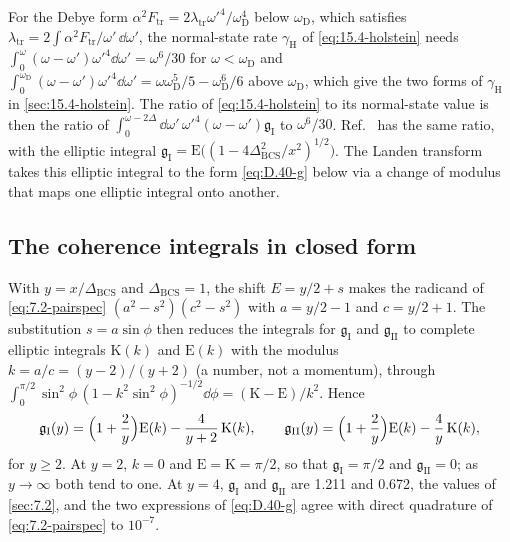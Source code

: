 For the Debye form $\alpha^2F_{\mathrm{tr}} = 2\lambda_{\mathrm{tr}}\omega'^4/\omega_{\mathrm{D}}^4$ below $\omega_{\mathrm{D}}$, which satisfies $\lambda_{\mathrm{tr}} = 2\int\alpha^2F_{\mathrm{tr}}/\omega'\,\dd\omega'$, the normal-state rate $\gamma_{\mathrm{H}}$ of \cref{eq:15.4-holstein} needs $\int_0^{\omega}(\omega - \omega')\omega'^4\dd\omega' = \omega^6/30$ for $\omega < \omega_{\mathrm{D}}$ and $\int_0^{\omega_{\mathrm{D}}}(\omega - \omega')\omega'^4\dd\omega' = \omega\omega_{\mathrm{D}}^5/5 - \omega_{\mathrm{D}}^6/6$ above $\omega_{\mathrm{D}}$, which give the two forms of $\gamma_{\mathrm{H}}$ in \cref{sec:15.4-holstein}. The ratio of \cref{eq:15.4-holstein} to its normal-state value is then the ratio of $\int_0^{\omega - 2\Delta}\dd\omega'\,\omega'^4(\omega - \omega')\mathfrak{g}_{\mathrm{I}}$ to $\omega^6/30$. Ref.~\cite[Eq.~(17)]{hochberg2016absorption} has the same ratio, with the elliptic integral $\mathfrak{g}_{\mathrm{I}} = \mathrm{E}\bigl((1 - 4\Delta_{\mathrm{BCS}}^2/x^2)^{1/2}\bigr)$. The Landen transform takes this elliptic integral to the form \cref{eq:D.40-g} below via a change of modulus that maps one elliptic integral onto another.

\subsection*{The coherence integrals in closed form}

With $y = x/\Delta_{\mathrm{BCS}}$ and $\Delta_{\mathrm{BCS}} = 1$, the shift $E = y/2 + s$ makes the radicand of \cref{eq:7.2-pairspec} $(a^2 - s^2)(c^2 - s^2)$ with $a = y/2 - 1$ and $c = y/2 + 1$. The substitution $s = a\sin\phi$ then reduces the integrals for $\mathfrak{g}_{\mathrm{I}}$ and $\mathfrak{g}_{\mathrm{II}}$ to complete elliptic integrals $\mathrm{K}(k)$ and $\mathrm{E}(k)$ with the modulus $k = a/c = (y - 2)/(y + 2)$ (a number, not a momentum), through $\int_0^{\pi/2}\sin^2\phi\,(1 - k^2\sin^2\phi)^{-1/2}\dd\phi = (\mathrm{K} - \mathrm{E})/k^2$. Hence
\begin{equation}
  \mathfrak{g}_{\mathrm{I}}(y) = \Bigl(1 + \frac2y\Bigr)\mathrm{E}(k) - \frac{4}{y + 2}\,\mathrm{K}(k) , \qquad
  \mathfrak{g}_{\mathrm{II}}(y) = \Bigl(1 + \frac2y\Bigr)\mathrm{E}(k) - \frac4y\,\mathrm{K}(k) ,
  \label{eq:D.40-g}
\end{equation}
for $y \ge 2$. At $y = 2$, $k = 0$ and $\mathrm{E} = \mathrm{K} = \pi/2$, so that $\mathfrak{g}_{\mathrm{I}} = \pi/2$ and $\mathfrak{g}_{\mathrm{II}} = 0$; as $y \to \infty$ both tend to one. At $y = 4$, $\mathfrak{g}_{\mathrm{I}}$ and $\mathfrak{g}_{\mathrm{II}}$ are 1.211 and 0.672, the values of \cref{sec:7.2}, and the two expressions of \cref{eq:D.40-g} agree with direct quadrature of \cref{eq:7.2-pairspec} to $10^{-7}$.

